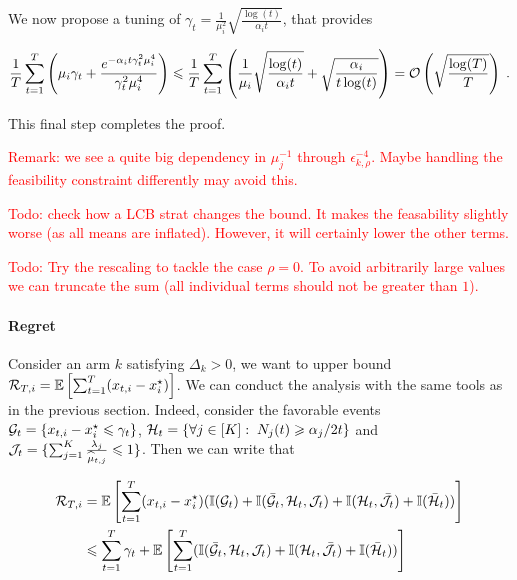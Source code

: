 We now propose a tuning of $\gamma_t = \frac{1}{\mu_i^2}\sqrt{\frac{\log(t)}{\alpha_i t}}$, that provides 

\[\frac{1}{T} \sum_{t=1}^T \left(\mu_i \gamma_t + \frac{e^{-\alpha_i t \gamma_t^2 \mu_i^4}}{\gamma_t^2 \mu_i^4}\right) \leqslant \frac{1}{T} \sum_{t=1}^T \left(\frac{1}{\mu_i}\sqrt{\frac{\log(t)}{\alpha_i t}} + \sqrt{\frac{\alpha_i}{t \log(t)}}\right) = \mathcal{O}\left(\sqrt{\frac{\log(T)}{T}}\right) \;. \]

This final step completes the proof. 

\textcolor{red}{Remark: we see a quite big dependency in $\mu_j^{-1}$ through $\epsilon_{k, \rho}^{-4}$. Maybe handling the feasibility constraint differently may avoid this.}

\textcolor{red}{Todo: check how a LCB strat changes the bound. It makes the feasability slightly worse (as all means are inflated). However, it will certainly lower the other terms.}

\textcolor{red}{Todo: Try the rescaling to tackle the case $\rho = 0$. To avoid arbitrarily large values we can truncate the sum (all individual terms should not be greater than $1$).}


\paragraph{Regret} Consider an arm $k$ satisfying $\Delta_k>0$, we want to upper bound $\mathcal{R}_{T, i} =  \mathbb{E}\left[\sum_{t=1}^T (x_{t, i} - x^\star_i)\right]$. We can conduct the analysis with the same tools as in the previous section. Indeed, consider the favorable events $\mathcal{G}_t = \{x_{t,i}-x_i^\star\leqslant \gamma_t \}$, $\mathcal{H}_t=\{\forall j \in [K]: \; N_j(t)\geqslant \alpha_j/2 t \}$ and $\mathcal{J}_t = \{\sum_{j=1}^K \frac{\lambda_j}{\widehat{\mu}_{t,j}}\leqslant 1 \}$. Then we can write that 

\begin{align*}
\mathcal{R}_{T,i} &= \mathbb{E}\left[\sum_{t=1}^T (x_{t, i} - x^\star_i)(\mathbb{I}(\mathcal{G}_t)+\mathbb{I}(\bar {\mathcal{G}}_t, \mathcal{H}_t, \mathcal{J}_t)+ \mathbb{I}(\mathcal{H}_t, \bar {\mathcal{J}}_t)+ \mathbb{I}(\bar{\mathcal{H}}_t))\right] \\
& \leqslant \sum_{t=1}^T \gamma_t + \mathbb{E}\left[\sum_{t=1}^T (\mathbb{I}(\bar {\mathcal{G}}_t, \mathcal{H}_t, \mathcal{J}_t)+ \mathbb{I}(\mathcal{H}_t, \bar {\mathcal{J}}_t)+ \mathbb{I}(\bar{\mathcal{H}}_t))\right]
\end{align*}


